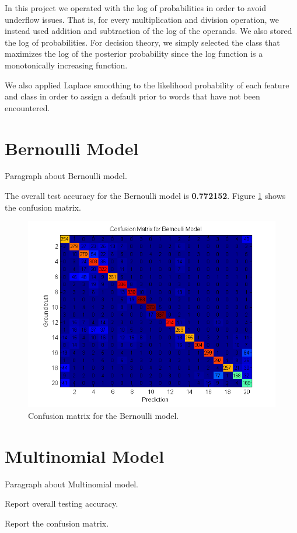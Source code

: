 \documentclass[12pt]{article}
\begin{document}
In this project we operated with the log of probabilities in order to avoid underflow issues. That is, for every multiplication and division operation, we instead used addition and subtraction of the log of the operands. We also stored the log of probabilities. For decision theory, we simply selected the class that maximizes the log of the posterior probability since the log function is a monotonically increasing function.

We also applied Laplace smoothing to the likelihood probability of each feature and class in order to assign a default prior to words that have not been encountered.

\section{Bernoulli Model}
Paragraph about Bernoulli model.

The overall test accuracy for the Bernoulli model is \textbf{0.772152}. Figure \ref{fig:confusionmat_bern} shows the confusion matrix.

\begin{figure}[!t]
  \centering
  \includegraphics[scale=1]{img/confusionmat_bern.png}
  \caption{Confusion matrix for the Bernoulli model.}
  \label{fig:confusionmat_bern}
\end{figure}

\section{Multinomial Model}

Paragraph about Multinomial model.

Report overall testing accuracy.

Report the confusion matrix.

%
\end{document}
